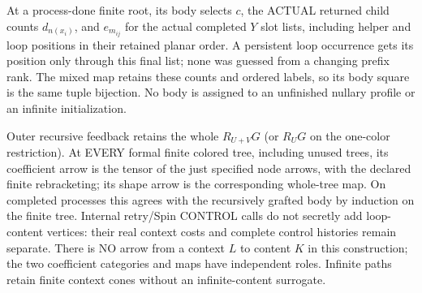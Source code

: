 \documentclass{article}
\begin{document}
At a process-done finite root, its body selects $c$, the ACTUAL returned child counts $d_{n(x_i)}$, and $e_{m_{ij}}$ for the actual completed $Y$ slot lists, including helper and loop positions in their retained planar order. A persistent loop occurrence gets its position only through this final list; none was guessed from a changing prefix rank. The mixed map retains these counts and ordered labels, so its body square is the same tuple bijection. No body is assigned to an unfinished nullary profile or an infinite initialization.

Outer recursive feedback retains the whole $R_{U+V}G$ (or $R_UG$ on the one-color restriction). At EVERY formal finite colored tree, including unused trees, its coefficient arrow is the tensor of the just specified node arrows, with the declared finite rebracketing; its shape arrow is the corresponding whole-tree map. On completed processes this agrees with the recursively grafted body by induction on the finite tree. Internal retry/Spin CONTROL calls do not secretly add loop-content vertices: their real context costs and complete control histories remain separate. There is NO arrow from a context $L$ to content $K$ in this construction; the two coefficient categories and maps have independent roles. Infinite paths retain finite context cones without an infinite-content surrogate.
\end{document}
